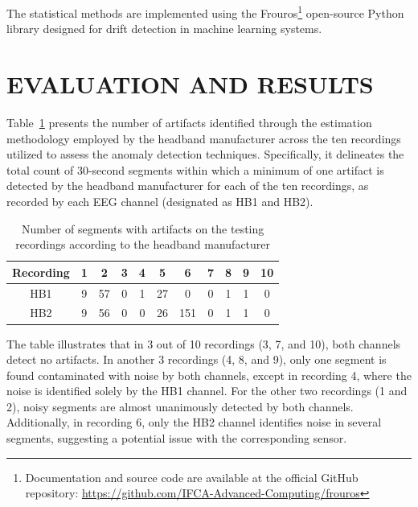 \documentclass[conference]{IEEEtran}
\begin{document}
The statistical methods are implemented using the Frouros\footnote{Documentation and source code are available at the official GitHub repository: \url{https://github.com/IFCA-Advanced-Computing/frouros}} open-source Python library designed for drift detection in machine learning systems.




\section{EVALUATION AND RESULTS}
Table~\ref{tab2} presents the number of artifacts identified through the estimation methodology employed by the headband manufacturer across the ten recordings utilized to assess the anomaly detection techniques. Specifically, it delineates the total count of 30-second segments within which a minimum of one artifact is detected by the headband manufacturer for each of the ten recordings, as recorded by each EEG channel (designated as HB1 and HB2).

\begin{table}[htbp]
\caption{Number of segments with artifacts on the testing recordings according to the headband manufacturer}
    \centering
    \renewcommand{\arraystretch}{1.3} %
    \begin{tabular}{|c|c|c|c|c|c|c|c|c|c|c|}
        \hline
        \textbf{Recording} & \textbf{1} & \textbf{2} & \textbf{3} & \textbf{4} & \textbf{5} & \textbf{6} & \textbf{7} & \textbf{8} & \textbf{9} & \textbf{10} \\
        \hline
        HB1 & 9 & 57 & 0 & 1 & 27 & 0 & 0 & 1 & 1 & 0 \\
        \hline
        HB2 & 9 & 56 & 0 & 0 & 26 & 151 & 0 & 1 & 1 & 0 \\
        \hline
    \end{tabular}
    \label{tab2}
\end{table}

The table illustrates that in 3 out of 10 recordings (3, 7, and 10), both channels detect no artifacts. In another 3 recordings (4, 8, and 9), only one segment is found contaminated with noise by both channels, except in recording 4, where the noise is identified solely by the HB1 channel. For the other two recordings (1 and 2), noisy segments are almost unanimously detected by both channels. Additionally, in recording 6, only the HB2 channel identifies noise in several segments, suggesting a potential issue with the corresponding sensor.
\end{document}
